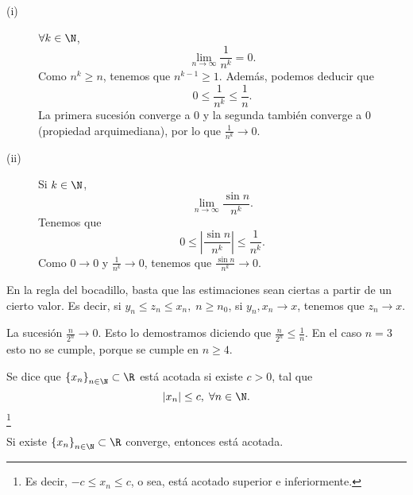 \begin{eg}
\normalfont 
\begin{description}
\item[(i)] $\displaystyle \forall k \in \N $, 
	\[\lim_{n \to \infty}\frac{1}{n^{k}} =0 .\]
Como $\displaystyle n^{k} \geq n $, tenemos que $\displaystyle n^{k-1} \geq 1 $. Además, podemos deducir que 
\[0 \leq \frac{1}{n^{k}} \leq \frac{1}{n} .\]
La primera sucesión converge a 0 y la segunda también converge a 0 (propiedad arquimediana), por lo que $\displaystyle \frac{1}{n^{k}} \to 0 $.
\item[(ii)] Si $\displaystyle k \in \N $, 
	\[\lim_{n \to \infty}\frac{\sin n}{n^{k}} .\]
Tenemos que
\[ 0 \leq \left|\frac{\sin n}{n^{k}}\right| \leq \frac{1}{n^{k}} .\]
Como $\displaystyle 0 \to 0 $ y $\displaystyle \frac{1}{n^{k}} \to 0 $, tenemos que $\displaystyle \frac{\sin n}{n^{k}} \to 0 $.
\end{description}
\end{eg}

\begin{observation}
\normalfont En la regla del bocadillo, basta que las estimaciones sean ciertas a partir de un cierto valor. Es decir, si $\displaystyle y_{n} \leq z_{n} \leq x_{n}, \; n\geq n_{0} $, si $\displaystyle y_{n}, x_{n} \to x $, tenemos que $\displaystyle z_{n} \to x $.
\end{observation}

\begin{eg}
\normalfont La sucesión $\displaystyle \frac{n}{2^{n}} \to 0$. Esto lo demostramos diciendo que $\displaystyle \frac{n}{2^{n}} \leq \frac{1}{n} $. En el caso $\displaystyle n = 3 $ esto no se cumple, porque se cumple en $\displaystyle n\geq 4 $. 
\end{eg}

\begin{fdefinition}[]
	\normalfont Se dice que $\displaystyle \left\{ x_{n}\right\}_{n\in\N}  \subset \R$ está acotada si existe $\displaystyle c > 0 $, tal que 
	\[ \left|x_{n}\right| \leq c, \; \forall n \in \N .\]
\footnote{Es decir, $\displaystyle -c \leq x_{n} \leq c $, o sea, está acotado superior e inferiormente.} 
\end{fdefinition}

\begin{ftheorem}[]
	\normalfont Si existe $\displaystyle \left\{ x_{n}\right\} _{n\in\N} \subset \R $ converge, entonces está acotada. 
\end{ftheorem}

